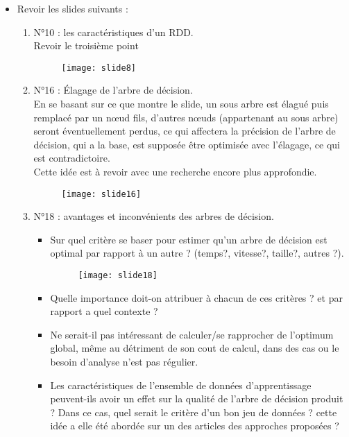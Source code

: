 \documentclass[a4paper, 11pt]{report}
\begin{document}
\begin{itemize}
\item Revoir les slides suivants :
\begin{enumerate}
\item N°10 : les caractéristiques d'un RDD.\\
Revoir le troisième point

\begin{figure}[!h]
\begin{center}
\texttt{[image: slide8]}
\end{center}
\end{figure}


\item N°16 : Élagage de l'arbre de décision.\\
En se basant sur ce que montre le slide, un sous arbre est élagué puis remplacé par un nœud fils, d'autres nœuds (appartenant au sous arbre) seront éventuellement perdus, ce qui affectera la précision de l'arbre de décision, qui a la base, est supposée être optimisée avec l'élagage, ce qui est contradictoire.\\Cette idée est à revoir avec une recherche encore plus approfondie. 

\begin{figure}[!h]
\begin{center}
\texttt{[image: slide16]}
\end{center}
\end{figure}



\item N°18 : avantages et inconvénients des arbres de décision.\\
\begin{itemize}
\item Sur quel critère se baser pour estimer qu'un arbre de décision est optimal par rapport à un autre ? (temps?, vitesse?, taille?, autres ?).
\begin{figure}[!h]
\begin{center}
\texttt{[image: slide18]}
\end{center}
\end{figure}


\item Quelle importance doit-on attribuer à chacun de ces critères ? et par rapport a quel contexte ?
\item Ne serait-il pas intéressant de calculer/se rapprocher de l'optimum global, même au détriment de son cout de calcul,  dans des cas ou le besoin d'analyse n'est pas régulier.
\item Les caractéristiques de l'ensemble de données d'apprentissage peuvent-ils avoir un effet sur la qualité de l'arbre de décision produit ? Dans ce cas, quel serait le critère d'un bon jeu de données ? cette idée a elle été abordée sur un des articles des approches proposées ? 
\end{itemize}


\end{enumerate}
\end{itemize}
\end{document}

